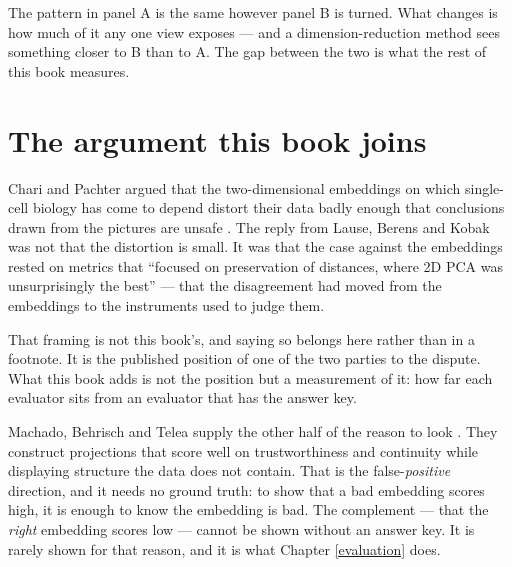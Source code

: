 \documentclass[
  british,
  a4paper,
]{book}
\begin{document}
The pattern in panel A is the same however panel B is turned. What changes is
how much of it any one view exposes --- and a dimension-reduction method sees
something closer to B than to A. The gap between the two is what the rest of
this book measures.

\section{The argument this book joins}\label{intro-background}

Chari and Pachter argued that the two-dimensional embeddings on which
single-cell biology has come to depend distort their data badly enough that
conclusions drawn from the pictures are unsafe \citep{chari2023specious}. The reply
from Lause, Berens and Kobak was not that the distortion is small. It was that
the case against the embeddings rested on metrics that ``focused on preservation
of distances, where 2D PCA was unsurprisingly the best'' \citep{lause2024elephant} ---
that the disagreement had moved from the embeddings to the instruments used to
judge them.

That framing is not this book's, and saying so belongs here rather than in a
footnote. It is the published position of one of the two parties to the dispute.
What this book adds is not the position but a measurement of it: how far each
evaluator sits from an evaluator that has the answer key.

Machado, Behrisch and Telea supply the other half of the reason to look
\citep{machado2025necessary}. They construct projections that score well on
trustworthiness and continuity while displaying structure the data does not
contain. That is the false-\emph{positive} direction, and it needs no ground truth:
to show that a bad embedding scores high, it is enough to know the embedding is
bad. The complement --- that the \emph{right} embedding scores low --- cannot be shown
without an answer key. It is rarely shown for that reason, and it is what
Chapter \ref{evaluation} does.
\end{document}
